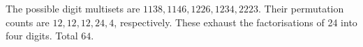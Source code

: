 The possible digit multisets are $1138,1146,1226,1234,2223$. Their permutation counts are $12,12,12,24,4$, respectively. These exhaust the factorisations of 24 into four digits. Total $\boxed{64}$.

